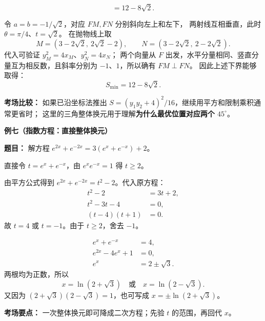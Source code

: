 \begin{examplebox}
\begin{description}[style=nextline,leftmargin=2.8em,labelsep=0.5em,itemsep=0.55em]
\[=\boxed{12-8\sqrt2}.
\]
\item[\textbf{第六步（验证两步不等式能同时取等）：}]
令 $a=b=-1/\sqrt2$，对应 $FM,FN$ 分别斜向左上和左下，
两射线互相垂直，此时 $\theta=\pi/4$、$t=\sqrt2$。
在抛物线上取
\[
M=(3-2\sqrt2,\ 2\sqrt2-2),\qquad
N=(3-2\sqrt2,\ 2-2\sqrt2).
\]
代入可验证 $y_M^2=4x_M$、$y_N^2=4x_N$；
两个向量从 $F$ 出发，水平分量相同、竖直分量互为相反数，且斜率分别为 $-1$、$1$，所以确有 $FM\perp FN$。
因此上述下界能够取得：
\[
\boxed{S_{\min}=12-8\sqrt2}.
\]
\end{description}
\textbf{考场比较：} 如果已沿坐标法推出
$S=(y_1y_2+4)^2/16$，继续用平方和限制乘积通常更省时；
这里的三角整体换元用于理解\textbf{为什么最优位置对应两个 $45^\circ$}。
\end{examplebox}
\clearpage

\begin{examplebox}
\textbf{\textcolor{CExample}{例七（指数方程：直接整体换元）}}

\textbf{题目：} 解方程 $e^{2x}+e^{-2x}=3(e^x+e^{-x})+2$。
\begin{description}[style=nextline,leftmargin=2.8em,labelsep=0.5em,itemsep=0.45em]
\item[\textbf{第一步（识别正负指数成对）：}]
直接令 $t=e^x+e^{-x}$，由 $e^xe^{-x}=1$ 得 $t\ge2$。
\item[\textbf{第二步（降次）：}]
由平方公式得到 $e^{2x}+e^{-2x}=t^2-2$。代入原方程：
\[
\begin{aligned}
t^2-2&=3t+2,\\
t^2-3t-4&=0,\\
(t-4)(t+1)&=0.
\end{aligned}
\]
故 $t=4$ 或 $t=-1$。由于 $t\ge2$，舍去 $-1$。
\item[\textbf{第三步（回代）：}]
\[
\begin{aligned}
e^x+e^{-x}&=4,\\
e^{2x}-4e^x+1&=0,\\
e^x&=2\pm\sqrt3.
\end{aligned}
\]
两根均为正数，所以
\[
\boxed{x=\ln(2+\sqrt3)\quad\text{或}\quad x=\ln(2-\sqrt3)}.
\]
又因为 $(2+\sqrt3)(2-\sqrt3)=1$，也可写成 $x=\pm\ln(2+\sqrt3)$。
\end{description}

\textbf{考场要点：} 一次整体换元即可降成二次方程；先验 $t$ 的范围，再回代 $x$。
\end{examplebox}
\clearpage
